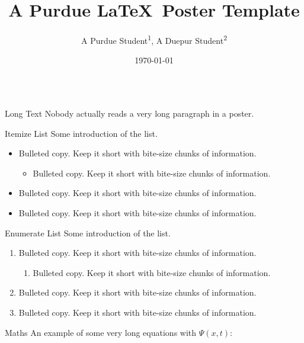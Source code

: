 \documentclass{purdue-poster}
\title{\Huge{A Purdue \LaTeX\ Poster Template}}
\author{\Large{A Purdue Student\texorpdfstring{\textsuperscript{1}}{}, A Duepur Student\texorpdfstring{\textsuperscript{2}}{}}}
\institute
{\large{Purdue University\texorpdfstring{\textsuperscript{1}}{}, Duepur University\texorpdfstring{\textsuperscript{2}},\\
Appearing at Overleaf Template}}
\date{\today}
\begin{document}
\begin{frame}{}
    \begin{columns}[c]
    \begin{column}{.48\linewidth}
    \begin{block}{\large Long Text}
        Nobody actually reads a very long paragraph in a poster.

        \bigskip

        \lipsum[2]
    \end{block}

    \begin{block}{Itemize List}
        Some introduction of the list.
        \begin{itemize}
            \item Bulleted copy. Keep it short with bite-size chunks of information.
            \begin{itemize}
                \item Bulleted copy. Keep it short with bite-size chunks of information.
            \end{itemize}
            \item Bulleted copy. Keep it short with bite-size chunks of information.
            \item Bulleted copy. Keep it short with bite-size chunks of information.
        \end{itemize}
    \end{block}

    \begin{block}{Enumerate List}
        Some introduction of the list.
        \begin{enumerate}
            \item Bulleted copy. Keep it short with bite-size chunks of information.
            \begin{enumerate}
                \item Bulleted copy. Keep it short with bite-size chunks of information.
            \end{enumerate}
            \item Bulleted copy. Keep it short with bite-size chunks of information.
            \item Bulleted copy. Keep it short with bite-size chunks of information.
        \end{enumerate}
    \end{block}

    \begin{block}{Maths}
        An example of some very long equations with $\Psi (x,t)$:
        

\end{block}
\end{column}
\end{columns}
\end{frame}
\end{document}
